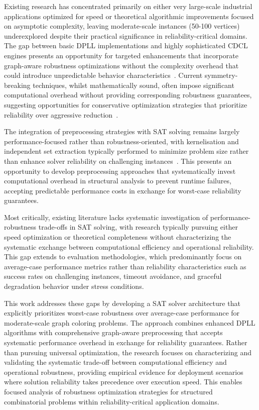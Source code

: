 Existing research has concentrated primarily on either very large-scale industrial applications optimized for speed or theoretical algorithmic improvements focused on asymptotic complexity, leaving moderate-scale instances (50-100 vertices) underexplored despite their practical significance in reliability-critical domains. The gap between basic DPLL implementations and highly sophisticated CDCL engines presents an opportunity for targeted enhancements that incorporate graph-aware robustness optimizations without the complexity overhead that could introduce unpredictable behavior characteristics~\cite{moskewicz2001chaff,marques2009handbook}. Current symmetry-breaking techniques, whilst mathematically sound, often impose significant computational overhead without providing corresponding robustness guarantees, suggesting opportunities for conservative optimization strategies that prioritize reliability over aggressive reduction~\cite{crawford1996symmetry}.

The integration of preprocessing strategies with SAT solving remains largely perfor\-mance-focused rather than robustness-oriented, with kernelisation and independent set extraction typically performed to minimize problem size rather than enhance solver reliability on challenging instances~\cite{lin2012coloring,jansen2013data}. This presents an opportunity to develop preprocessing approaches that systematically invest computational overhead in structural analysis to prevent runtime failures, accepting predictable performance costs in exchange for worst-case reliability guarantees.

Most critically, existing literature lacks systematic investigation of performance-robustness trade-offs in SAT solving, with research typically pursuing either speed optimization or theoretical completeness without characterizing the systematic exchange between computational efficiency and operational reliability. This gap extends to evaluation methodologies, which predominantly focus on average-case performance metrics rather than reliability characteristics such as success rates on challenging instances, timeout avoidance, and graceful degradation behavior under stress conditions.

This work addresses these gaps by developing a SAT solver architecture that explicitly prioritizes worst-case robustness over average-case performance for moderate-scale graph coloring problems. The approach combines enhanced DPLL algorithms with comprehensive graph-aware preprocessing that accepts systematic performance overhead in exchange for reliability guarantees. Rather than pursuing universal optimization, the research focuses on characterizing and validating the systematic trade-off between computational efficiency and operational robustness, providing empirical evidence for deployment scenarios where solution reliability takes precedence over execution speed. This enables focused analysis of robustness optimization strategies for structured combinatorial problems within reliability-critical application domains.